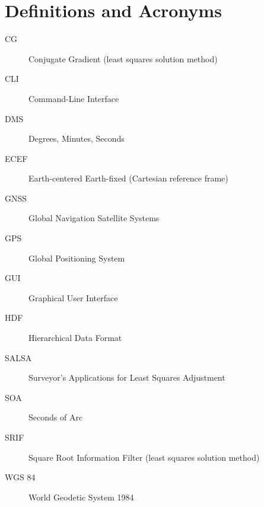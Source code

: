 
\chapter{Definitions and Acronyms}

\begin{description}

\item[CG] Conjugate Gradient (least squares solution method)

\item[CLI] Command-Line Interface

\item[DMS] Degrees, Minutes, Seconds

\item[ECEF] Earth-centered Earth-fixed (Cartesian reference frame)

\item[GNSS] Global Navigation Satellite Systems

\item[GPS] Global Positioning System

\item[GUI] Graphical User Interface

\item[HDF] Hierarchical Data Format

\item[SALSA] Surveyor's Applications for Least Squares Adjustment

\item[SOA] Seconds of Arc

\item[SRIF] Square Root Information Filter (least squares solution method)

\item[WGS 84] World Geodetic System 1984

\end{description}
